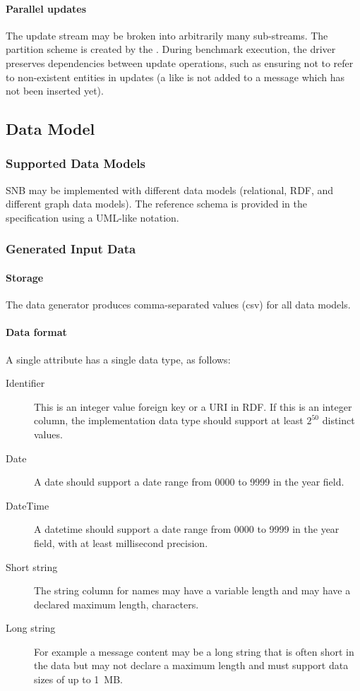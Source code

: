 \paragraph{Parallel updates}
The update stream may be broken into arbitrarily many sub-streams. The partition scheme is created by the \datagen. During benchmark execution, the driver preserves dependencies between update operations, such as ensuring not to refer to non-existent entities in updates (\eg a like is not added to a message which has not been inserted yet).

\subsection{Data Model}

\subsubsection{Supported Data Models}

SNB may be implemented with different data models (\eg relational, RDF, and different graph data models). The reference schema is provided in the specification using a UML-like notation. 


\subsubsection{Generated Input Data}
\label{sec:generated-data}

\paragraph{Storage}
The data generator produces comma-separated values (csv) for all data models.

\paragraph{Data format}
A single attribute has a single data type, as follows:
\begin{description}
    \item [Identifier] This is an integer value foreign key or a URI in RDF. If this is an integer column, the implementation data type should support at least $2^{50}$ distinct values.
    \item [Date] A date should support a date range from 0000 to 9999 in the year field.
    \item [DateTime] A datetime should support a date range from 0000 to 9999 in the year field, with at least millisecond precision.
    \item [Short string] The string column for names may have a variable length and may have a declared maximum length,  characters.
    \item [Long string] For example a message content may be a long string that is often short in the data but may not declare a maximum length and must support data sizes of up to 1~MB.
\end{description}

